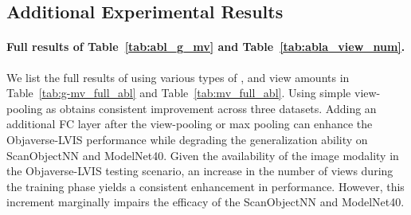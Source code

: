 \documentclass{article} \usepackage{iclr2024_conference,times}
\begin{document}
\begin{table*}[thpb]
\centering
  \renewcommand\tabcolsep{2pt}
  \caption{The ablations of inference schemes under different settings of views ().}
  \label{tab:mv-mm_joint_abl}
\end{table*} 
\subsection{Additional Experimental Results}
\paragraph{Full results of Table~\ref{tab:abl_g_mv} and Table~\ref{tab:abla_view_num}.}
We list the full results of using various types of , and view amounts in Table~\ref{tab:g-mv_full_abl} and Table~\ref{tab:mv_full_abl}.
Using simple view-pooling as  obtains consistent improvement across three datasets. 
Adding an additional FC layer after the view-pooling or max pooling can enhance the Objaverse-LVIS performance while degrading the generalization ability on ScanObjectNN and ModelNet40.
Given the availability of the image modality in the Objaverse-LVIS testing scenario, an increase in the number of views during the training phase yields a consistent enhancement in performance. 
However, this increment marginally impairs the efficacy of the ScanObjectNN and ModelNet40.
\end{document}
